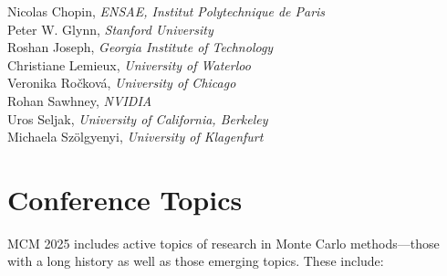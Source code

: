 \documentclass[12pt,lettersize,oneside]{book} %
\begin{document}
Nicolas Chopin, \emph{ENSAE, Institut Polytechnique de Paris} \\[2em]
Peter W. Glynn, \emph{Stanford University} \\[2em]
Roshan Joseph, \emph{Georgia Institute of Technology} \\[2em]
Christiane Lemieux, \emph{University of Waterloo} \\[2em]
Veronika Ro\v{c}kov\'a, \emph{University of Chicago} \\[2em]
Rohan Sawhney, \emph{NVIDIA} \\[2em]
Uros Seljak, \emph{University of California, Berkeley} \\[2em]
Michaela Sz\"olgyenyi, \emph{University of Klagenfurt}



\section{Conference Topics}

MCM 2025  includes active topics of research in Monte Carlo methods—those
with a long history as well as those emerging topics. These include:
\end{document}
